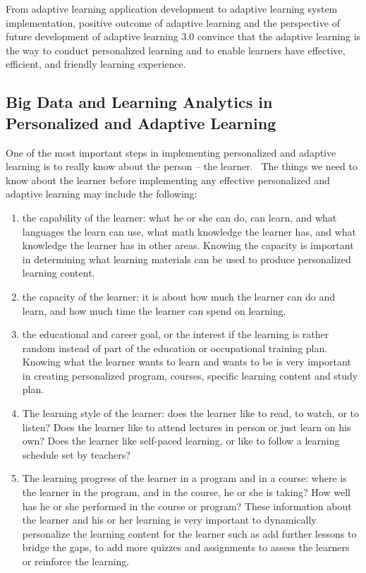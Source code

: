 \documentclass[english]{textolivre}
\begin{document}
From adaptive learning application development to adaptive learning system implementation, positive outcome of adaptive learning and the perspective of future development of adaptive learning 3.0 convince that the adaptive learning is the way to conduct personalized learning and to enable learners have effective, efficient, and friendly learning experience.

\subsection{Big Data and Learning Analytics in Personalized and Adaptive Learning}
One of the most important steps in implementing personalized and adaptive learning is to really know about the person – the learner.  The things we need to know about the learner before implementing any effective personalized and adaptive learning may include the following:

\begin{enumerate}
    \item the capability of the learner: what he or she can do, can learn, and what languages the learn can use, what math knowledge the learner has, and what knowledge the learner has in other areas. Knowing the capacity is important in determining what learning materials can be used to produce personalized learning content.
    \item the capacity of the learner: it is about how much the learner can do and learn, and how much time the learner can spend on learning.
    \item the educational and career goal, or the interest if the learning is rather random instead of part of the education or occupational training plan. Knowing what the learner wants to learn and wants to be is very important in creating personalized program, courses, specific learning content and study plan.
    \item The learning style of the learner: does the learner like to read, to watch, or to listen? Does the learner like to attend lectures in person or just learn on his own? Does the learner like self-paced learning, or like to follow a learning schedule set by teachers?
    \item The learning progress of the learner in a program and in a course: where is the learner in the program, and in the course, he or she is taking? How well has he or she performed in the course or program? These information about the learner and his or her learning is very important to dynamically personalize the learning content for the learner such as add further lessons to bridge the gaps, to add more quizzes and assignments to assess the learners or reinforce the learning.
\end{enumerate}
\end{document}
